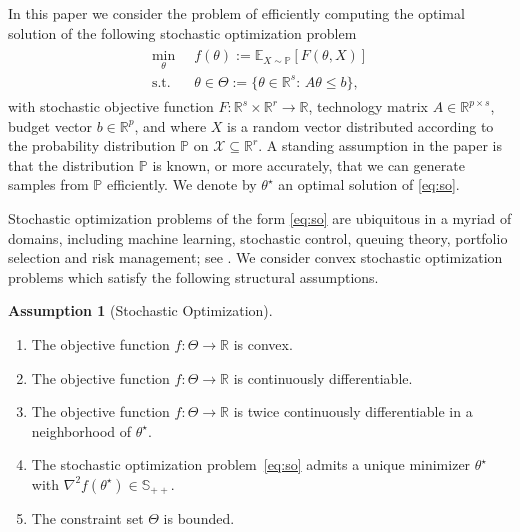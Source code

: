 \documentclass[11pt,a4paper]{article}
\theoremstyle{definition}
\newtheorem{assumption}[theorem]{Assumption}
\DeclareMathOperator*{\st}{s.t.}
\renewcommand{\Re}{\mathbb R}
\renewcommand{\S}{\mathbb S}
\newcommand{\mb}{\mathbb}
\begin{document}
In this paper we consider the problem of efficiently computing the optimal solution of the following stochastic optimization  problem
\begin{align}
  \label{eq:so}
  \begin{split}
    \min_\theta\;\; & f(\theta):= \mathbb E_{X \sim \mathbb P}\left[ F(\theta, X) \right] \\
    \st \;\; & \theta \in \Theta:=\{\theta \in \mathbb R^s:\, A \theta \leq b\},
  \end{split}
  \tag{SO}
\end{align}
with stochastic objective function $F:\mathbb R^s \times \mathbb R^r \to \mathbb R$, technology matrix $A \in \mathbb R^{p \times s}$, budget vector $b \in \mathbb R^p$, and where $X$ is a random vector distributed according to the probability distribution $\mathbb P$ on $\mathcal X\subseteq \Re^r$. A standing assumption in the paper is that the distribution $\mathbb P$ is known, or more accurately, that we can generate samples from $\mb P$ efficiently. We denote by $\theta^\star$ an optimal solution of \eqref{eq:so}.

Stochastic optimization problems of the form \eqref{eq:so} are ubiquitous in a myriad of domains, including machine learning, stochastic control, queuing theory, portfolio selection and risk management; see \citet{schneider2007stochastic,shapiro2021lectures}.
We consider convex stochastic optimization problems which satisfy the following structural assumptions.

\begin{assumption}[Stochastic Optimization]~
\label{assump:SO}
\begin{enumerate}[label=(\roman*)]
\item\label{assump:SO:convex} The objective function $f:\Theta\to\Re$ is convex.

\item \label{assump:SO:differentiable} The objective function $f:\Theta\to\Re$ is continuously differentiable.

\item \label{assump:SO:twice:differentiable} The objective function $f:\Theta\to\Re$ is twice continuously differentiable in a neighborhood of $\theta^\star$.

\item\label{assump:SO:unique} The stochastic optimization problem~\eqref{eq:so} admits a unique minimizer $\theta^\star$ with $\nabla^2 f(\theta^\star)\in \S_{++}$.
  
\item\label{assump:SO:bounded} The constraint set $\Theta$ is bounded.

\end{enumerate}
\end{assumption}
\end{document}
